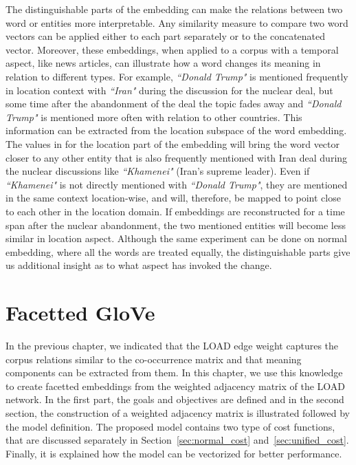 \noindent 
The distinguishable parts of the embedding can make the relations between two word or entities more interpretable. Any similarity measure to compare two word vectors can be applied either to each part separately or to the concatenated vector. Moreover, these embeddings, when applied to a corpus with a temporal aspect, like news articles, can illustrate how a word changes its meaning in relation to different types. For example, \emph{``Donald Trump"} is mentioned frequently in location context with \emph{``Iran"} during the discussion for the nuclear deal, but some time after the abandonment of the deal the topic fades away and \emph{``Donald Trump"}  is mentioned more often with relation to other countries. This information can be extracted from the location subspace of the word embedding. The values in for the location part of the embedding will bring the word vector closer to any other entity that is also frequently mentioned with Iran deal during the nuclear discussions like \emph{``Khamenei"} (Iran's supreme leader). Even if \emph{``Khamenei"} is not directly mentioned with \emph{``Donald Trump"}, they are mentioned in the same context location-wise, and will, therefore, be mapped to point close to each other in the location domain. If embeddings are reconstructed for a time span after the nuclear abandonment, the two mentioned entities will become less similar in location aspect. Although the same experiment can be done on normal embedding, where all the words are treated equally, the distinguishable parts give us additional insight as to what aspect has invoked the change. 
\section{Facetted GloVe }\label{sec:facetted_glove}
In the previous chapter, we indicated that the LOAD edge weight captures the corpus relations similar to the co-occurrence matrix and that meaning components can be extracted from them. In this chapter, we use this knowledge to create facetted embeddings from the weighted adjacency matrix of the LOAD network. In the first part, the goals and objectives are defined and in the second section, the construction of a weighted adjacency matrix is illustrated followed by the model definition. The proposed model contains two type of cost functions, that are discussed separately in Section~\ref{sec:normal_cost} and~\ref{sec:unified_cost}. Finally, it is explained how the model can be vectorized for better performance. 
